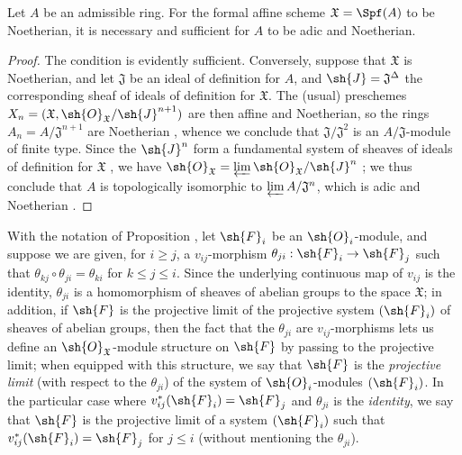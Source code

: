 \begin{corollary}[10.6.5]
\label{I.10.6.5}
Let $A$ be an admissible ring.
For the formal affine scheme $\mathfrak{X}=\Spf(A)$ to be Noetherian, it is necessary and sufficient for $A$ to be adic and Noetherian.
\end{corollary}

\begin{proof}
The condition is evidently sufficient.
Conversely, suppose that $\mathfrak{X}$ is Noetherian, and let $\mathfrak{J}$ be an ideal of definition for $A$, and $\sh{J}=\mathfrak{J}^\Delta$ the corresponding sheaf of ideals of definition for $\mathfrak{X}$.
The (usual) preschemes $X_n=(\mathfrak{X},\sh{O}_\mathfrak{X}/\sh{J}^{n+1})$ are then affine and Noetherian, so the rings $A_n=A/\mathfrak{J}^{n+1}$ are Noetherian , whence we conclude that $\mathfrak{J}/\mathfrak{J}^2$ is an $A/\mathfrak{J}$-module of finite type.
Since the $\sh{J}^n$ form a fundamental system of sheaves of ideals of definition for $\mathfrak{X}$ , we have $\sh{O}_\mathfrak{X}=\varprojlim\sh{O}_\mathfrak{X}/\sh{J}^n$ ; we thus conclude  that $A$ is topologically isomorphic to $\varprojlim A/\mathfrak{J}^n$, which is adic and Noetherian .
\end{proof}

\begin{remark}[10.6.6]
\label{I.10.6.6}
With the notation of Proposition , let $\sh{F}_i$ be an $\sh{O}_i$-module, and suppose we are given, for $i\geq j$, a $v_{ij}$-morphism $\theta_{ji}:\sh{F}_i\to\sh{F}_j$ such that $\theta_{kj}\circ\theta_{ji}=\theta_{ki}$ for $k\leq j\leq i$.
Since the underlying continuous map of $v_{ij}$ is the identity, $\theta_{ji}$ is a homomorphism of sheaves of abelian groups to the space $\mathfrak{X}$; in addition, if $\sh{F}$ is the projective limit of the projective system $(\sh{F}_i)$ of sheaves of abelian groups, then the fact that the $\theta_{ji}$ are $v_{ij}$-morphisms lets us define an $\sh{O}_\mathfrak{X}$-module structure on $\sh{F}$ by passing to the projective limit; when equipped with this structure, we say that $\sh{F}$ is the \emph{projective limit} (with respect to the $\theta_{ji}$) of the system of $\sh{O}_i$-modules $(\sh{F}_i)$.
In the particular case where $v_{ij}^*(\sh{F}_i)=\sh{F}_j$ and $\theta_{ji}$ is the \emph{identity}, we say that $\sh{F}$ is the projective limit of a system $(\sh{F}_i)$ such that $v_{ij}^*(\sh{F}_i)=\sh{F}_j$ for $j\leq i$ (without mentioning the $\theta_{ji}$).
\end{remark}

